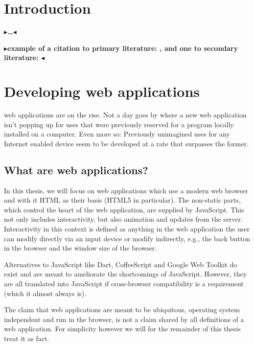 \documentclass[twoside,11pt,openright]{report}
\newcommand{\todo}[1]{{\color[rgb]{.5,0,0}\textbf{$\blacktriangleright$#1$\blacktriangleleft$}}}
\begin{document}
\chapter{Introduction}
\label{ch:intro}

\todo{\dots}

\todo{example of a citation to primary literature: \citeA{lazypropagation2010},
and one to secondary literature: \citeB{ambiguity2010}}


\chapter{Developing web applications}
web applications are on the rise. Not a day goes by where a new
web application isn't popping up for uses that were previously reserved for a
program locally installed on a computer. Even more so: Previously
unimagined uses for any Internet enabled device seem to be developed
at a rate that surpasses the former.

\section{What are web applications?}
In this thesis, we will focus on web applications which use a
modern web browser and with it HTML as their basis (HTML5 in particular).
The non-static parts, which control the heart of the web application,
are supplied by JavaScript. This not only includes interactivity, but also
animation and updates from the server.\\
Interactivity in this context is defined as anything in the web application
the user can modify directly via an input device or modify indirectly, e.g.,
the back button in the browser and the window size of the browser.

Alternatives to JavaScript like Dart, CoffeeScript and Google Web Toolkit
do exist and are meant to ameliorate the shortcomings of JavaScript. 
However, they are all translated into JavaScript if cross-browser
compatibility is a requirement (which it almost always is).

The claim that web applications are meant to be ubiquitous,
operating system independent and run in the browser, is not a claim shared
by all definitions of a web application. For simplicity however we will for the
remainder of this thesis treat it as fact.
\end{document}

